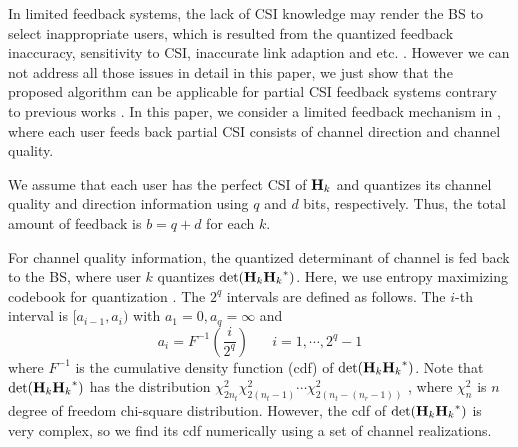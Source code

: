 \documentclass[journal,twoside]{IEEEtranTCOM}
\begin{document}
In limited feedback systems, the lack of CSI knowledge may render the BS to select inappropriate users, which is resulted from the quantized feedback inaccuracy, sensitivity to CSI, inaccurate link adaption and etc. \cite{LimitedFeedbackEDITOR}. %
However we can not address all  those issues in detail in this paper, we  just show that the proposed algorithm can be applicable for partial CSI feedback systems contrary to previous works \cite{SRN,Correlation1,Correlation2,c_n,Determinant}. In this paper, we consider a limited feedback mechanism in \cite{CD_conf}, where each user feeds back partial CSI consists of channel direction and channel quality.

We assume that each user has the perfect CSI of ${\bf{H}}_k$ and quantizes its channel quality and direction information using $q$ and $d$ bits, respectively. Thus, the total amount of feedback is $b=q+d$ for each $k$.

For channel quality information, the quantized determinant of channel is fed back to the BS, where user $k$ quantizes $\det({{\bf{H}}_k}{{\bf{H}}_k}^*)$. Here, we use entropy maximizing codebook for quantization \cite{EntropyMaxCodebook}. The $2^q$ intervals are defined as follows. The $i$-th interval is $[a_{i-1},a_i)$ with $a_1=0,a_{q} = \infty$ and
\begin{equation}
{a_i} = {F^{ - 1}}\left( {\frac{i}{{{2^{{q}}}}}} \right)\,\,\,\,\,\,\,\,\,\,i = 1, \cdots ,{2^{{q}}} - 1
\end{equation}
where ${F^{ - 1}}$ is the cumulative density function (cdf) of  $\det({{\bf{H}}_k}{{\bf{H}}_k}^*)$. Note that $\det({{\bf{H}}_k}{{\bf{H}}_k}^*)$ has the distribution $\chi _{2{n_t}}^2\chi _{2({n_t} - 1)}^2 \cdots \chi _{2({n_t} - ({n_r} - 1))}^2$ \cite{WishwartMatrix}, where $\chi _{n}^2$ is $n$ degree of freedom chi-square distribution. However, the cdf of $\det({{\bf{H}}_k}{{\bf{H}}_k}^*)$ is very complex, so we find its cdf numerically using a set of channel realizations.
\end{document}
